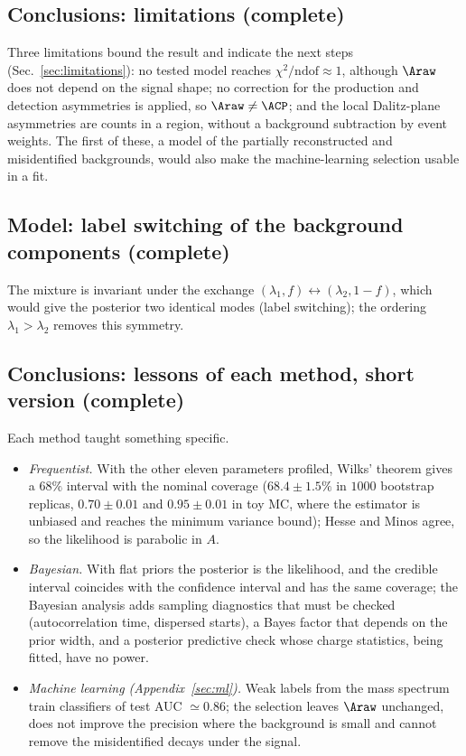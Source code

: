 \subsection{Conclusions: limitations (complete)}
Three limitations bound the result and indicate the next steps (Sec.~\ref{sec:limitations}): no tested model reaches $\chi^2/\mathrm{ndof}\approx1$, although $\Araw$ does not depend on the signal shape; no correction for the production and detection asymmetries is applied, so $\Araw\neq\ACP$; and the local Dalitz-plane asymmetries are counts in a region, without a background subtraction by event weights. The first of these, a model of the partially reconstructed and misidentified backgrounds, would also make the machine-learning selection usable in a fit.

\subsection{Model: label switching of the background components (complete)}
The mixture is invariant under the exchange $(\lambda_1,f)\leftrightarrow(\lambda_2,1-f)$, which would give the posterior two identical modes (label switching); the ordering $\lambda_1>\lambda_2$ removes this symmetry.

\subsection{Conclusions: lessons of each method, short version (complete)}
Each method taught something specific.
\begin{itemize}[leftmargin=*,itemsep=2pt]
\item \emph{Frequentist.} With the other eleven parameters profiled, Wilks' theorem gives a $68\%$ interval with the nominal coverage ($68.4\pm1.5\%$ in $1000$ bootstrap replicas, $0.70\pm0.01$ and $0.95\pm0.01$ in toy MC, where the estimator is unbiased and reaches the minimum variance bound); Hesse and Minos agree, so the likelihood is parabolic in $A$.
\item \emph{Bayesian.} With flat priors the posterior is the likelihood, and the credible interval coincides with the confidence interval and has the same coverage; the Bayesian analysis adds sampling diagnostics that must be checked (autocorrelation time, dispersed starts), a Bayes factor that depends on the prior width, and a posterior predictive check whose charge statistics, being fitted, have no power.
\item \emph{Machine learning (Appendix~\ref{sec:ml}).} Weak labels from the mass spectrum train classifiers of test AUC $\simeq0.86$; the selection leaves $\Araw$ unchanged, does not improve the precision where the background is small and cannot remove the misidentified decays under the signal.
\end{itemize}

